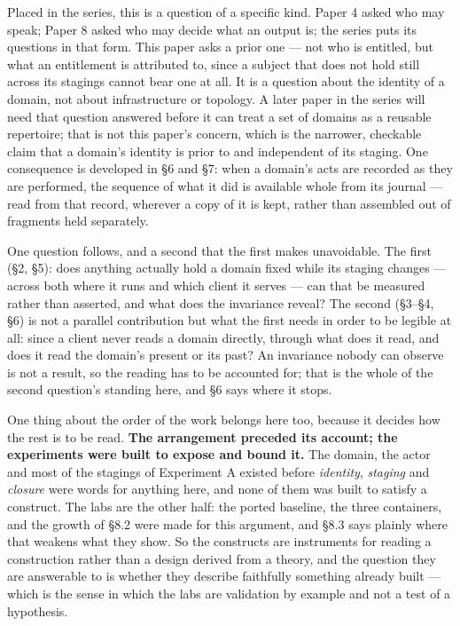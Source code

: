 \documentclass[
]{article}
\newcounter{none} %
\begin{document}
Placed in the series, this is a question of a specific kind. Paper 4
asked who may speak; Paper 8 asked who may decide what an output is; the
series puts its questions in that form. This paper asks a prior one ---
not who is entitled, but what an entitlement is attributed to, since a
subject that does not hold still across its stagings cannot bear one at
all. It is a question about the identity of a domain, not about
infrastructure or topology. A later paper in the series will need that
question answered before it can treat a set of domains as a reusable
repertoire; that is not this paper's concern, which is the narrower,
checkable claim that a domain's identity is prior to and independent of
its staging. One consequence is developed in §6 and §7: when a domain's
acts are recorded as they are performed, the sequence of what it did is
available whole from its journal --- read from that record, wherever a
copy of it is kept, rather than assembled out of fragments held
separately.

One question follows, and a second that the first makes unavoidable. The
first (§2, §5): does anything actually hold a domain fixed while its
staging changes --- across both where it runs and which client it serves
--- can that be measured rather than asserted, and what does the
invariance reveal? The second (§3--§4, §6) is not a parallel
contribution but what the first needs in order to be legible at all:
since a client never reads a domain directly, through what does it read,
and does it read the domain's present or its past? An invariance nobody
can observe is not a result, so the reading has to be accounted for;
that is the whole of the second question's standing here, and §6 says
where it stops.

One thing about the order of the work belongs here too, because it
decides how the rest is to be read. \textbf{The arrangement preceded its
account; the experiments were built to expose and bound it.} The domain,
the actor and most of the stagings of Experiment A existed before
\emph{identity}, \emph{staging} and \emph{closure} were words for
anything here, and none of them was built to satisfy a construct. The
labs are the other half: the ported baseline, the three containers, and
the growth of §8.2 were made for this argument, and §8.3 says plainly
where that weakens what they show. So the constructs are instruments for
reading a construction rather than a design derived from a theory, and
the question they are answerable to is whether they describe faithfully
something already built --- which is the sense in which the labs are
validation by example and not a test of a hypothesis.
\end{document}
